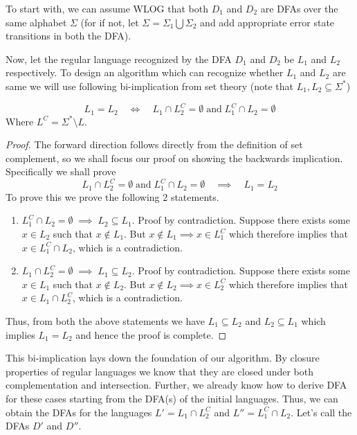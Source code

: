 \begin{soln}
To start with, we can assume WLOG that both $D_1$ and $D_2$ are DFAs over the same alphabet $\Sigma$ (for if not, let $\Sigma = \Sigma_1 \bigcup \Sigma_2$ and add appropriate error state transitions in both the DFA).

Now, let the regular language recognized by the DFA $D_1$ and $D_2$ be $L_1$ and $L_2$ respectively. To design an algorithm which can recognize whether $L_1$ and $L_2$ are same we will use following bi-implication from set theory (note that $L_1, L_2 \subseteq \Sigma^*$)
\begin{claim}
    $$L_1 = L_2 \quad \Longleftrightarrow \quad L_1 \cap L_2^C = \emptyset \; \text{and} \; L_1^C \cap L_2 = \emptyset$$
    Where $L^C = \Sigma^* \setminus L$.
\end{claim}
\begin{proof}
The forward direction follows directly from the definition of set complement, so we shall focus our proof on showing the backwards implication. Specifically we shall prove
\[
L_1 \cap L_2^C = \emptyset \; \text{and} \; L_1^C \cap L_2 = \emptyset \quad \implies \quad L_1 = L_2
\]
To prove this we prove the following 2 statements.
\begin{enumerate}
    \item $L_1^C \cap L_2 = \emptyset \; \implies \; L_2 \subseteq L_1$. Proof by contradiction. Suppose there exists some $x \in L_2$ such that $x \notin L_1$. But $x \notin L_1 \implies x \in L_1^C$ which therefore implies that $x \in L_1^C \cap L_2$, which is a contradiction.
    \item $L_1 \cap L_2^C = \emptyset \; \implies \; L_1 \subseteq L_2$. Proof by contradiction. Suppose there exists some $x \in L_1$ such that $x \notin L_2$. But $x \notin L_2 \implies x \in L_2^C$ which therefore implies that $x \in L_1 \cap L_2^C$, which is a contradiction.
\end{enumerate}
Thus, from both the above statements we have $L_1 \subseteq L_2$ and $L_2 \subseteq L_1$ which implies $L_1 = L_2$ and hence the proof is complete.
\end{proof}

This bi-implication lays down the foundation of our algorithm. By closure properties of regular languages we know that they are closed under both complementation and intersection. Further, we already know how to derive DFA for these cases starting from the DFA(s) of the initial languages. Thus, we can obtain the DFAs for the languages $L' = L_1 \cap L_2^C$ and $L'' = L_1^C \cap L_2$. Let's call the DFAs $D'$ and $D''$.


\end{soln}
